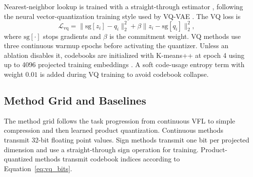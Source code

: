 \documentclass{article}
\begin{document}
Nearest-neighbor lookup is trained with a straight-through estimator \citep{bengio2013estimating}, following the neural vector-quantization training style used by VQ-VAE \citep{oord2017neural}. The VQ loss is
\begin{equation}
    \mathcal{L}_{\mathrm{vq}}
    =
    \lVert \mathrm{sg}[z_i] - q_i \rVert_2^2
    + \beta \lVert z_i - \mathrm{sg}[q_i] \rVert_2^2,
    \label{eq:vq_loss}
\end{equation}
where $\mathrm{sg}[\cdot]$ stops gradients and $\beta$ is the commitment weight. VQ methods use three continuous warmup epochs before activating the quantizer. Unless an ablation disables it, codebooks are initialized with K-means++ at epoch 4 using up to 4096 projected training embeddings \citep{arthur2007kmeans}. A soft code-usage entropy term with weight $0.01$ is added during VQ training to avoid codebook collapse.

\subsection{Method Grid and Baselines}

The method grid follows the task progression from continuous VFL to simple compression and then learned product quantization. Continuous methods transmit 32-bit floating point values. Sign methods transmit one bit per projected dimension and use a straight-through sign operation for training. Product-quantized methods transmit codebook indices according to Equation~\ref{eq:vq_bits}.
\end{document}
